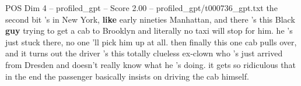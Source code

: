 \begin{textsample}{POS Dim 4 – profiled\_gpt – Score 2.00 – profiled\_gpt/t000736\_gpt.txt}  \label{ex:f4_pos_033}
the second bit ’s in New York, \textbf{like} early nineties Manhattan, and there ’s this Black \textbf{guy} trying to get a cab to Brooklyn and literally no taxi will stop for him. he ’s just stuck there, no one ’ll pick him up at all. then finally this one cab pulls over, and it turns out the driver ’s this totally clueless ex‑clown who ’s just arrived from Dresden and doesn't really know what he ’s doing. it gets so ridiculous that in the end the passenger basically insists on driving the cab himself.

\end{textsample}
